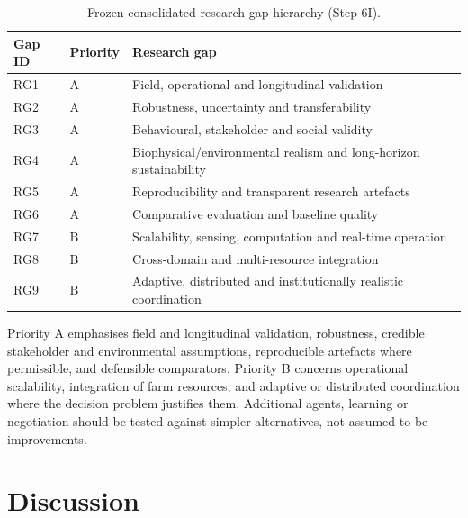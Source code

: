\documentclass[11pt,a4paper]{article}
\begin{document}
\begin{table}[H]
\centering
\scriptsize
\caption{Frozen consolidated research-gap hierarchy (Step 6I).}
\label{tab:integrated_gap_priorities}
\setlength{\tabcolsep}{3pt}
\begin{tabularx}{\textwidth}{@{}p{}p{}X@{}}
\toprule
\textbf{Gap ID} & \textbf{Priority} & \textbf{Research gap} \\
\midrule
RG1 & A & Field, operational and longitudinal validation \\
RG2 & A & Robustness, uncertainty and transferability \\
RG3 & A & Behavioural, stakeholder and social validity \\
RG4 & A & Biophysical/environmental realism and long-horizon sustainability \\
RG5 & A & Reproducibility and transparent research artefacts \\
RG6 & A & Comparative evaluation and baseline quality \\
\midrule
RG7 & B & Scalability, sensing, computation and real-time operation \\
RG8 & B & Cross-domain and multi-resource integration \\
RG9 & B & Adaptive, distributed and institutionally realistic coordination \\
\bottomrule
\end{tabularx}
\end{table}

Priority A emphasises field and longitudinal validation, robustness,
credible stakeholder and environmental assumptions, reproducible
artefacts where permissible, and defensible comparators. Priority B
concerns operational scalability, integration of farm resources, and
adaptive or distributed coordination where the decision problem
justifies them. Additional agents, learning or negotiation should be
tested against simpler alternatives, not assumed to be improvements.





\section{Discussion}
\label{sec:discussion}
\end{document}
